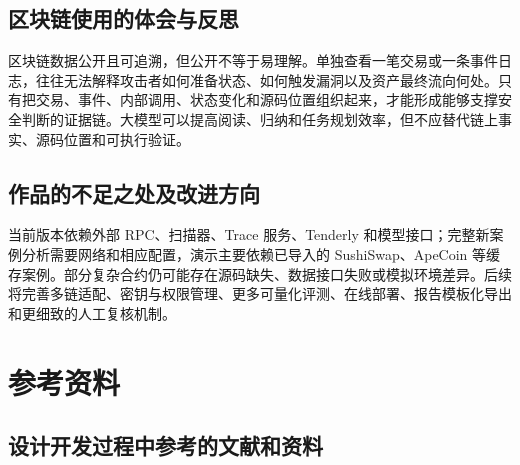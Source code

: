 \documentclass[UTF8,a4paper,12pt]{ctexart}
\begin{document}
\subsection{区块链使用的体会与反思}

区块链数据公开且可追溯，但公开不等于易理解。单独查看一笔交易或一条事件日志，往往无法解释攻击者如何准备状态、如何触发漏洞以及资产最终流向何处。只有把交易、事件、内部调用、状态变化和源码位置组织起来，才能形成能够支撑安全判断的证据链。大模型可以提高阅读、归纳和任务规划效率，但不应替代链上事实、源码位置和可执行验证。

\subsection{作品的不足之处及改进方向}

当前版本依赖外部 RPC、扫描器、Trace 服务、Tenderly 和模型接口；完整新案例分析需要网络和相应配置，演示主要依赖已导入的 SushiSwap、ApeCoin 等缓存案例。部分复杂合约仍可能存在源码缺失、数据接口失败或模拟环境差异。后续将完善多链适配、密钥与权限管理、更多可量化评测、在线部署、报告模板化导出和更细致的人工复核机制。

\section{参考资料}

\subsection{设计开发过程中参考的文献和资料}
\end{document}
